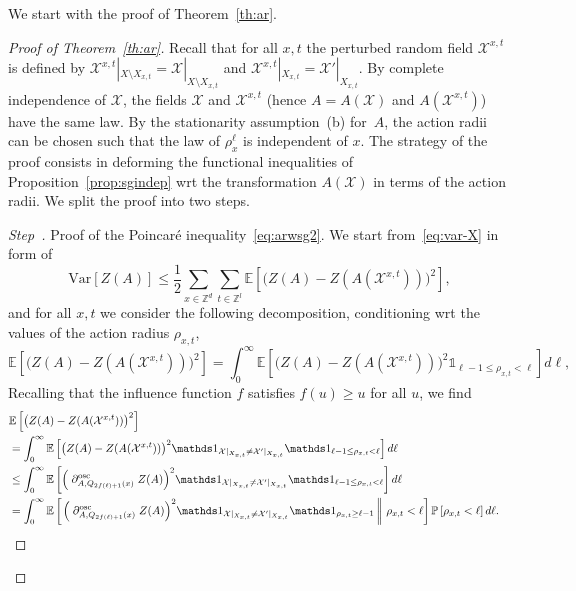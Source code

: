 \documentclass[AHL,Unicode,longabstracts]{cedram}
\newcommand{\Z}{\mathbb Z}
\newcommand{\expec}[1]{\mathbb{E}\left[#1 \right]}
\newcommand{\pr}[1]{\mathbb{P}\left[#1 \right]}
\newcommand{\expeC}[2]{\mathbb{E}\left[\left. #1 \,\right\|\,#2\right]}
\newcommand{\X}{\mathcal X}
\newcommand{\osc}{\partial^{\mathrm{osc}}}
\newcommand{\oscd}[1]{\mathrel{\osc_{#1}}}
\newcommand{\var}[1]{\mathrm{Var}\left[#1\right]}
\newcounter{stepcount}
\newenvironment{step}{\refstepcounter{stepcount}\begin{proof}[Step~\thestepcount]}{\let\qed\relax\end{proof}}
\begin{document}
We start with the proof of Theorem~\ref{th:ar}.
\begin{proof}[Proof of Theorem~\ref{th:ar}]
Recall that for all $x,t$ the perturbed random field $\X^{x,t}$ is defined by $\X^{x,t}|_{X\setminus X_{x,t}}=\X|_{X\setminus X_{x,t}}$ and $\X^{x,t}|_{X_{x,t}}=\X'|_{X_{x,t}}$. By complete independence of $\X$, the fields $\X$ and $\X^{x,t}$ (hence $A=A(\X)$ and $A(\X^{x,t})$) have the same law. By the stationarity assumption~(b) for~$A$, the action radii can be chosen such that the law of $\rho_x^\ell$ is independent of $x$. The strategy of the proof consists in deforming the functional inequalities of Proposition~\ref{prop:sgindep} wrt the transformation $A(\X)$ in terms of the action radii. We split the proof into two steps.



\begin{step}{Proof of the Poincaré inequality~\eqref{eq:arwsg2}.}\label{step1prooftheo2.6}
We start from~\eqref{eq:var-X} in form of
\begin{equation}\label{eq:var-X-re0}
\var{Z(A)}\le\frac12\sum_{x\in\Z^d}\sum_{t\in\Z^l}\expec{\big(Z(A)-Z(A(\X^{x,t}))\big)^2},
\end{equation}
and for all $x,t$ we consider the following decomposition, conditioning wrt the values of the action radius $\rho_{x,t}$,
\begin{equation*}
\expec{\big(Z(A)-Z(A(\X^{x,t}))\big)^2}=\int_0^\infty \expec{\big(Z(A)-Z(A(\X^{x,t}))\big)^2\mathds1_{\ell-1\le \rho_{x,t}< \ell}}d\ell,
\end{equation*}
Recalling that the influence function $f$ satisfies $f(u)\ge u$ for all $u$, we find
\begin{align*}
\lefteqn{\expec{\big(Z(A)-Z(A(\X^{x,t}))\big)^2}}\\
&=\int_0^\infty \expec{\big(Z(A)-Z(A(\X^{x,t}))\big)^2\mathds1_{\X|_{X_{x,t}}\ne \X'|_{X_{x,t}}}\mathds1_{\ell-1\le \rho_{x,t}< \ell}}d\ell\\
&\le\int_0^\infty \expec{\Big(\oscd{A,Q_{2f(\ell)+1}(x)}Z(A)\Big)^2\mathds1_{\X|_{X_{x,t}}\ne \X'|_{X_{x,t}}}\mathds1_{\ell-1\le \rho_{x,t}< \ell}}d\ell\\
&=\int_0^\infty \expeC{\Big(\oscd{A,Q_{2f(\ell)+1}(x)}Z(A)\Big)^2\mathds1_{\X|_{X_{x,t}}\ne \X'|_{X_{x,t}}}\mathds1_{\rho_{x,t}\ge\ell-1}}{\rho_{x,t}<\ell}\pr{\rho_{x,t}< \ell}d\ell.
\end{align*}
\pagebreak


\end{step}
\end{proof}
\end{document}
